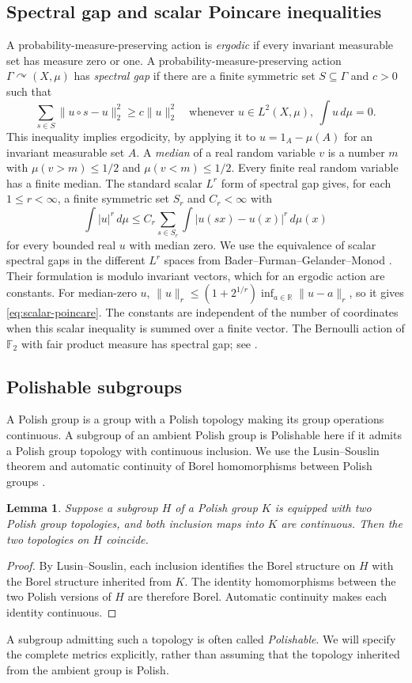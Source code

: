 \documentclass[11pt]{article}
\numberwithin{equation}{section}
\newtheorem{lemma}[theorem]{Lemma}
\theoremstyle{definition}
\newcommand{\R}{\mathbb R}
\begin{document}
\subsection{Spectral gap and scalar Poincare inequalities}
A probability-measure-preserving action is \emph{ergodic} if every
invariant measurable set has measure zero or one.
A probability-measure-preserving action
$\Gamma\curvearrowright(X,\mu)$ has \emph{spectral gap} if there are
a finite symmetric set $S\subseteq\Gamma$ and $c>0$ such that
\[
 \sum_{s\in S}\|u\circ s-u\|_2^2
       \ge c\|u\|_2^2
 \quad\text{whenever }u\in L^2(X,\mu),\ \int u\,d\mu=0.
\]
This inequality implies ergodicity, by applying it to
$u=1_A-\mu(A)$ for an invariant measurable set $A$.
A \emph{median} of a real random variable $v$ is a number $m$
with $\mu(v>m)\le1/2$ and $\mu(v<m)\le1/2$.
Every finite real random variable has a finite median.
The standard scalar $L^r$ form of spectral gap gives, for each
$1\le r<\infty$, a finite symmetric set $S_r$ and $C_r<\infty$ with
\begin{equation}\label{eq:scalar-poincare}
 \int |u|^r\,d\mu
 \le C_r\sum_{s\in S_r}\int |u(sx)-u(x)|^r\,d\mu(x)
\end{equation}
for every bounded real $u$ with median zero.
We use the equivalence of scalar spectral gaps in the different
$L^r$ spaces from Bader--Furman--Gelander--Monod
\cite[Remark~4.3]{BFGM}.
Their formulation is modulo invariant vectors, which for an
ergodic action are constants. For median-zero $u$,
$\|u\|_r\le(1+2^{1/r})\inf_{a\in\R}\|u-a\|_r$,
so it gives \eqref{eq:scalar-poincare}.
The constants are independent of the number of coordinates when
this scalar inequality is summed over a finite vector.
The Bernoulli action of $\mathbb F_2$ with fair product measure
has spectral gap; see \cite[Remark~6.4]{KidaTuckerDrob}.


\subsection{Polishable subgroups}
A Polish group is a group with a Polish topology making its group
operations continuous. A subgroup of an ambient Polish group is
Polishable here if it admits a Polish group topology with continuous
inclusion. We use the Lusin--Souslin theorem and automatic continuity
of Borel homomorphisms between Polish groups
\cite[Theorems~1.3.1 and~2.3.3]{Gao}.
\begin{lemma}\label{lem:unique-topology}
Suppose a subgroup $H$ of a Polish group $K$ is equipped with two Polish
group topologies, and both inclusion maps into $K$ are continuous.
Then the two topologies on $H$ coincide.
\end{lemma}
\begin{proof}
By Lusin--Souslin, each inclusion identifies the Borel structure on $H$
with the Borel structure inherited from $K$. The identity homomorphisms
between the two Polish versions of $H$ are therefore Borel. Automatic
continuity makes each identity continuous.
\end{proof}
A subgroup admitting such a topology is often called \emph{Polishable}.
We will specify the complete metrics explicitly, rather than assuming
that the topology inherited from the ambient group is Polish.
\end{document}
